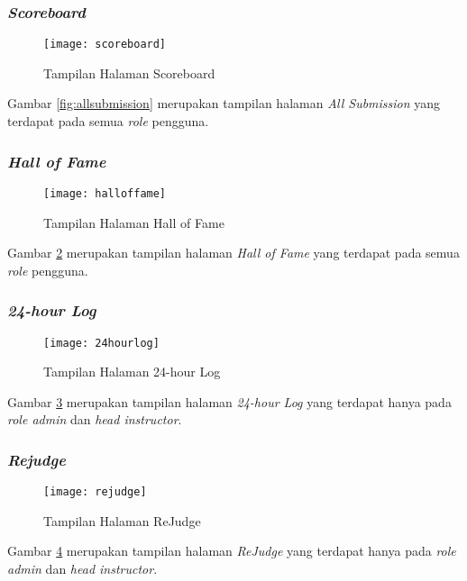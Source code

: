 \subsubsection{\textit{Scoreboard}}
\begin{figure}[H]
	\centering  
	\texttt{[image: scoreboard]}  
	\caption[Tampilan Halaman \textit{Scoreboard}]{Tampilan Halaman Scoreboard} 
	\label{fig:scoreboard} 
\end{figure}

Gambar \ref{fig:allsubmission} merupakan tampilan halaman \textit{All Submission} yang terdapat pada semua \textit{role} pengguna.

\subsubsection{\textit{Hall of Fame}}
\begin{figure}[H]
	\centering  
	\texttt{[image: halloffame]}  
	\caption[Tampilan Halaman \textit{Hall of Fame}]{Tampilan Halaman Hall of Fame} 
	\label{fig:halloffame} 
\end{figure}

Gambar \ref{fig:halloffame} merupakan tampilan halaman \textit{Hall of Fame} yang terdapat pada semua \textit{role} pengguna.


\subsubsection{\textit{24-hour Log}}
\begin{figure}[H]
	\centering  
	\texttt{[image: 24hourlog]}  
	\caption[Tampilan Halaman \textit{24-hour Log}]{Tampilan Halaman 24-hour Log} 
	\label{fig:24hourlog} 
\end{figure}

Gambar \ref{fig:24hourlog} merupakan tampilan halaman \textit{24-hour Log} yang terdapat hanya pada \textit{role admin} dan \textit{head instructor}.

\subsubsection{\textit{Rejudge}}
\begin{figure}[H]
	\centering  
	\texttt{[image: rejudge]}  
	\caption[Tampilan Halaman \textit{ReJudge}]{Tampilan Halaman ReJudge} 
	\label{fig:rejudge} 
\end{figure}

Gambar \ref{fig:rejudge} merupakan tampilan halaman \textit{ReJudge} yang terdapat hanya pada \textit{role admin} dan \textit{head instructor}.

